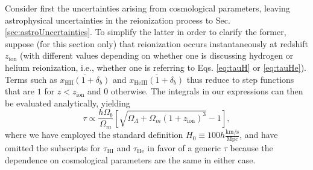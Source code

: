 \documentclass[twocolumn,aps,prd,nofootinbib,showpacs]{revtex4-1}
\begin{document}
Consider first the uncertainties arising from cosmological parameters, leaving astrophysical uncertainties in the reionization process to Sec. \ref{sec:astroUncertainties}. To simplify the latter in order to clarify the former, suppose (for this section only) that reionization occurs instantaneously at redshift $z_\textrm{ion}$ (with different values depending on whether one is discussing hydrogen or helium reionization, i.e., whether one is referring to Eqs. \ref{eq:tauH} or \ref{eq:tauHe}). Terms such as $\overline{x_\textrm{HII} (1+\delta_b)}$ and $\overline{x_\textrm{HeIII} (1+\delta_b)}$ thus reduce to step functions that are $1$ for $z<z_\textrm{ion}$ and $0$ otherwise. The integrals in our expressions can then be evaluated analytically, yielding
\begin{equation}
\label{eq:exactConstant}
\tau \propto \frac{h \Omega_b }{\Omega_m} \left[ \sqrt{\Omega_\Lambda + \Omega_m (1+z_\textrm{ion})^3} - 1 \right],
\end{equation}
where we have employed the standard definition $H_0 \equiv 100h \frac{\textrm{km}/\textrm{s}}{\textrm{Mpc}}$, and have omitted the subscripts for $\tau_\textrm{HI}$ and $\tau_\textrm{He}$ in favor of a generic $\tau$ because the dependence on cosmological parameters are the same in either case.
\end{document}
